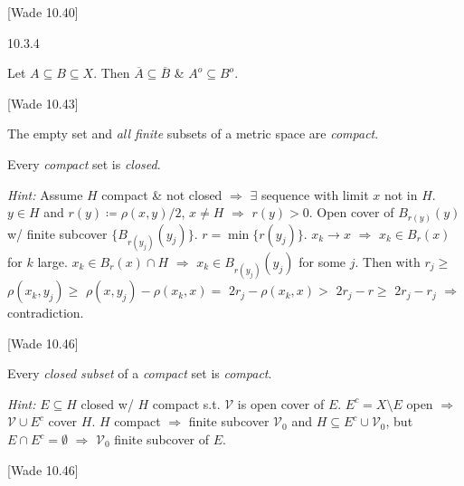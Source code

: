 \documentclass[10pt]{article} %
\newcommand{\cw}[1]{[Wade #1]}
\newcommand{\Hint}{\vspace{0.2em}\textit{Hint: }}
\renewcommand{\geq}{\geqslant}
\begin{document}
\begin{multicols}{3}
\begin{theorem}{\cw{10.40}}{}
\end{theorem}

\begin{exercise}{10.3.4}{}

    Let $A \subseteq B \subseteq X$. Then $\overline{A} \subseteq \overline{B}$ \& $A^o \subseteq B^o$.

\end{exercise}

\begin{remark}{\cw{10.43}}{}

    The empty set and \emph{all finite} subsets of a metric space are \emph{compact}.

\end{remark}

\begin{remark}{10.44}{}

    Every \emph{compact} set is \emph{closed}.

    \Hint Assume $H$ compact \& not closed $\Rightarrow$ $\exists$ sequence with limit $x$ not in $H$. $y \in H$ and $r(y) \coloneqq \rho(x,y)/2$, $x \neq H$ $\Rightarrow$ $r(y) > 0$. Open cover of $B_{r(y)}(y)$ w/ finite subcover $\{B_{r(y_j)}(y_j)\}$. $r = \min\{r(y_j)\}$. $x_k \to x$ $\Rightarrow$ $x_k \in B_r(x)$ for $k$ large. $x_k \in B_r(x) \cap H$ $\Rightarrow$ $x_k \in B_{r(y_j)}(y_j)$ for some $j$. Then with $r_j \geq$ $\rho(x_k,y_j) \geq$ $\rho(x,y_j) - \rho(x_k,x) =$ $2r_j - \rho(x_k,x) >$ $2r_j - r \geq$ $2r_j - r_j$ $\Rightarrow$ contradiction. 

\end{remark}

\begin{remark}{\cw{10.46}}{}

    Every \emph{closed subset} of a \emph{compact} set is \emph{compact}.

    \Hint $E \subseteq H$ closed w/ $H$ compact s.t. $\mathcal{V}$ is open cover of $E$. $E^c = X \setminus E$ open $\Rightarrow$ $\mathcal{V} \cup E^c$ cover $H$. $H$ compact $\Rightarrow$ finite subcover $\mathcal{V}_0$ and $H \subseteq E^c \cup \mathcal{V}_0$, but $E \cap E^c = \emptyset$ $\Rightarrow$ $\mathcal{V}_0$ finite subcover of $E$.

\end{remark}

\begin{theorem}{\cw{10.46}}{}


\end{theorem}
\end{multicols}
\end{document}
